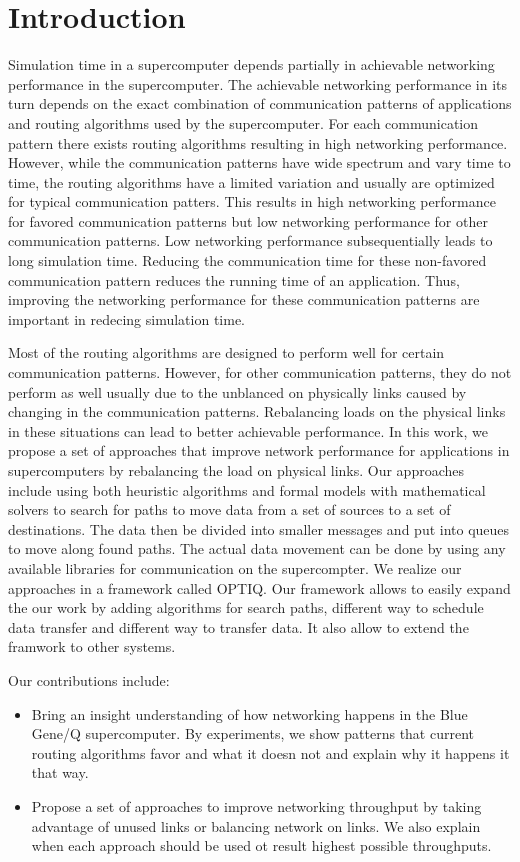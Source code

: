 \section{Introduction}
\label{sec:intro}
Simulation time in a supercomputer depends partially in achievable networking performance in the supercomputer. The achievable networking performance in its turn depends on the exact combination of communication patterns of applications and routing algorithms used by the supercomputer. For each communication pattern there exists routing algorithms resulting in high networking performance. However, while the communication patterns have wide spectrum and vary time to time, the routing algorithms have a limited variation and usually are optimized for typical communication patters. This results in high networking performance for favored communication patterns but low networking performance for other communication patterns. Low networking performance subsequentially leads to long simulation time. Reducing the communication time for these non-favored communication pattern reduces the running time of an application. Thus, improving the networking performance for these communication patterns are important in redecing simulation time. 

Most of the routing algorithms are designed to perform well for certain communication patterns. However, for other communication patterns, they do not perform as well usually due to the unblanced on physically links caused by changing in the communication patterns. Rebalancing loads on the physical links in these situations can lead to better achievable performance. 
In this work, we propose a set of approaches that improve network performance for applications in supercomputers by rebalancing the load on physical links. Our approaches include using both heuristic algorithms and formal models with mathematical solvers to search for paths to move data from a set of sources to a set of destinations. The data then be divided into smaller messages and put into queues to move along found paths. The actual data movement can be done by using any available libraries for communication on the supercompter. We realize our approaches in a framework called OPTIQ. Our framework allows to easily expand the our work by adding algorithms for search paths, different way to schedule data transfer and different way to transfer data. It also allow to extend the framwork to other systems.

Our contributions include:
\begin{itemize}
\item Bring an insight understanding of how networking happens in the Blue Gene/Q supercomputer. By experiments, we show patterns that current routing algorithms favor and what it doesn not and explain why it happens it that way.
\item Propose a set of approaches to improve networking throughput by taking advantage of unused links or balancing network on links. We also explain when each approach should be used ot result highest possible throughputs.
\end{itemize}

